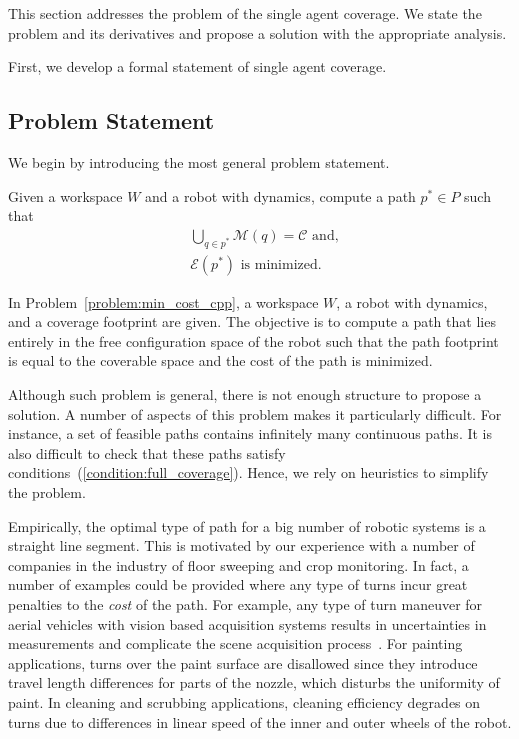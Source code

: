 \documentclass[../main.tex]{subfiles}
\begin{document}
This section addresses the problem of the single agent coverage. We state the problem and its derivatives and propose a solution with the appropriate analysis.

First, we develop a formal statement of single agent coverage.

\subsection{Problem Statement}
\label{sec:singel_problem_statement}
We begin by introducing the most general problem statement.

\begin{problem}
\label{problem:min_cost_cpp}
	Given a workspace $W$ and a robot with dynamics, compute a path $p^*\in P$ such that
	\begin{equation}
	\label{condition:full_coverage}
	\begin{aligned}
		& \bigcup_{q\in p^*}\mathcal{M}(q)=\mathcal{C}\text{ and},\\
		& \mathcal{E}(p^*)\text{ is minimized}.
	\end{aligned}
	\end{equation}
\end{problem}

In Problem~\ref{problem:min_cost_cpp}, a workspace $W$, a robot with dynamics, and a coverage footprint are given. The objective is to compute a path that lies entirely in the free configuration space of the robot such that the path footprint is equal to the coverable space and the cost of the path is minimized.

Although such problem is general, there is not enough structure to propose a solution. A number of aspects of this problem makes it particularly difficult. For instance, a set of feasible paths contains infinitely many continuous paths. It is also difficult to check that these paths satisfy conditions~(\ref{condition:full_coverage}). Hence, we rely on heuristics to simplify the problem.

Empirically, the optimal type of path for a big number of robotic systems is a straight line segment. This is motivated by our experience with a number of companies in the industry of floor sweeping and crop monitoring. In fact, a number of examples could be provided where any type of turns incur great penalties to the \emph{cost} of the path. For example, any type of turn maneuver for aerial vehicles with vision based acquisition systems results in uncertainties in measurements and complicate the scene acquisition process~\cite{frew2004vision}. For painting applications, turns over the paint surface are disallowed since they introduce travel length differences for parts of the nozzle, which disturbs the uniformity of paint. In cleaning and scrubbing applications, cleaning efficiency degrades on turns due to differences in linear speed of the inner and outer wheels of the robot.  
\end{document}
